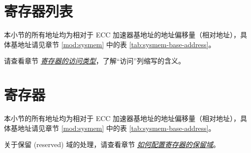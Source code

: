 \documentclass[main\_\_CN.tex]{subfiles}
\begin{document}



\newpage
\hypertarget{ecc-reg-summ}{}
\section{寄存器列表}
\label{sec:ecc-reg-summ}

本小节的所有地址均为相对于 ECC 加速器基地址的地址偏移量（相对地址），具体基地址请见章节 \ref{mod:sysmem} \textit{} 中的表 \ref{tab:sysmem-base-address}。

请查看章节 \hyperref[glossary-access-types]{\textit{寄存器的访问类型}}，了解“访问”列缩写的含义。






\newpage
\section{寄存器}

本小节的所有地址均为相对于 ECC 加速器基地址的地址偏移量（相对地址），具体基地址请见章节 \ref{mod:sysmem} \textit{} 中的表 \ref{tab:sysmem-base-address}。

关于保留 (reserved) 域的处理，请查看章节 \hyperref[programming-reserved-field]{\textit{如何配置寄存器的保留域}}。


\end{document}
